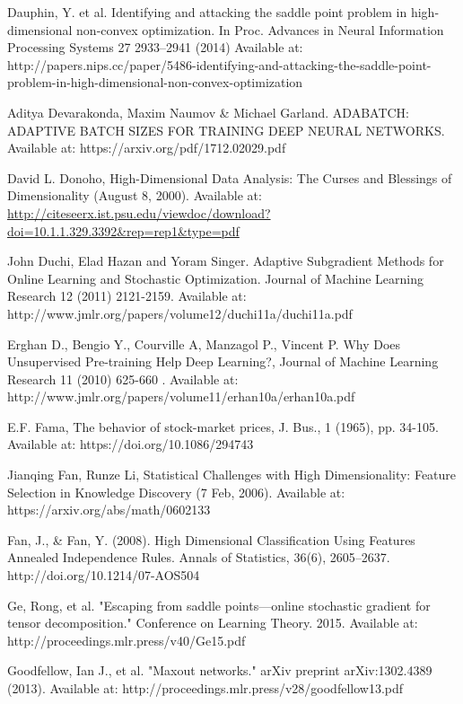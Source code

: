 \documentclass[a4paper,latin]{paper}
\begin{document}
\begin{thebibliography}{bibliography}
Dauphin, Y. et al. Identifying and attacking the saddle point problem in high-dimensional non-convex optimization. In Proc. Advances in Neural Information Processing Systems 27 2933–2941 (2014)
Available at: http://papers.nips.cc/paper/5486-identifying-and-attacking-the-saddle-point-problem-in-high-dimensional-non-convex-optimization 

Aditya Devarakonda, Maxim Naumov \& Michael Garland. ADABATCH: ADAPTIVE BATCH SIZES FOR TRAINING
DEEP NEURAL NETWORKS. Available at: https://arxiv.org/pdf/1712.02029.pdf

David L. Donoho, High-Dimensional Data Analysis: The Curses and Blessings of 
Dimensionality (August 8, 2000). Available at: \url{http://citeseerx.ist.psu.edu/viewdoc/download?doi=10.1.1.329.3392&rep=rep1&type=pdf}

John Duchi, Elad Hazan and Yoram Singer. Adaptive Subgradient Methods for
Online Learning and Stochastic Optimization. Journal of Machine Learning Research 12 (2011) 
2121-2159. Available at: http://www.jmlr.org/papers/volume12/duchi11a/duchi11a.pdf

Erghan D., Bengio Y., Courville A, Manzagol P., Vincent P. Why Does Unsupervised Pre-training Help Deep 
Learning?, Journal of Machine Learning Research 11 (2010) 625-660 . Available 
at: http://www.jmlr.org/papers/volume11/erhan10a/erhan10a.pdf

E.F. Fama, The behavior of stock-market prices, J. Bus., 1 (1965), pp. 34-105. 
Available at: https://doi.org/10.1086/294743

Jianqing Fan, Runze Li, 
Statistical Challenges with High Dimensionality: Feature Selection in Knowledge Discovery 
(7 Feb, 2006). Available at: https://arxiv.org/abs/math/0602133

Fan, J., \& Fan, Y. (2008). High Dimensional Classification Using Features Annealed Independence Rules. Annals of Statistics, 36(6), 2605–2637. http://doi.org/10.1214/07-AOS504

Ge, Rong, et al. "Escaping from saddle points—online stochastic gradient for tensor decomposition." Conference on Learning Theory. 2015.
Available at: http://proceedings.mlr.press/v40/Ge15.pdf 

Goodfellow, Ian J., et al. "Maxout networks." arXiv preprint arXiv:1302.4389 (2013).
Available at: http://proceedings.mlr.press/v28/goodfellow13.pdf


\end{thebibliography}
\end{document}
